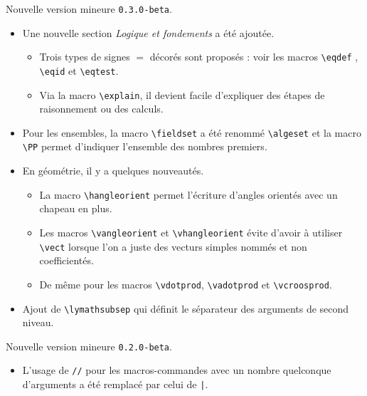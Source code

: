 \documentclass[12pt,a4paper]{article}
\begin{document}
\begin{description}[leftmargin=1em]

    \item[2019-07-23] Nouvelle version mineure \verb+0.3.0-beta+.
    \begin{itemize}
        \item Une nouvelle section \emph{\og Logique et fondements \fg} a été ajoutée.
        \begin{itemize}
            \item Trois types de signes $=$ décorés sont proposés : voir les macros \verb+\eqdef+ , \verb+\eqid+ et \verb+\eqtest+.

            \item Via la macro \verb+\explain+, il devient facile d'expliquer des étapes de raisonnement ou des calculs.
        \end{itemize}

        \item Pour les ensembles, la macro \verb+\fieldset+ a été renommé \verb+\algeset+ et la macro \verb+\PP+ permet d'indiquer l'ensemble des nombres premiers.

        \item En géométrie, il y a quelques nouveautés.
        \begin{itemize}
            \item La macro \verb+\hangleorient+ permet l'écriture d'angles orientés avec un chapeau en plus.

            \item Les macros \verb+\vangleorient+ et \verb+\vhangleorient+ évite d'avoir à utiliser \verb+\vect+ lorsque l'on a juste des vecturs simples nommés et non coefficientés.

            \item De même pour les macros \verb+\vdotprod+, \verb+\vadotprod+ et \verb+\vcroosprod+.
        \end{itemize}

        \item Ajout de \verb+\lymathsubsep+ qui définit le séparateur des arguments de second niveau.
    \end{itemize}


    \item[2019-02-21] Nouvelle version mineure \verb+0.2.0-beta+.
    \begin{itemize}
        \item L'usage de \verb+//+ pour les macros-commandes avec un nombre quelconque d'arguments a été remplacé par celui de \verb+|+.


\end{itemize}
\end{description}
\end{document}
